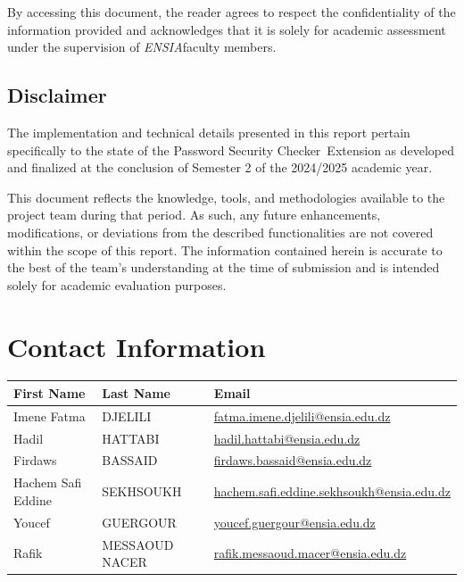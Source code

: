 \documentclass[11pt,oneside,a4paper]{book}
\newcommand{\extensionname}{Password Security Checker}
\newcommand{\esia}{\textit{ENSIA}}
\begin{document}
By accessing this document, the reader agrees to respect the confidentiality of the information provided and acknowledges that it is solely for academic assessment under the supervision of \esia faculty members.

\section*{Disclaimer}
The implementation and technical details presented in this report pertain specifically to the state of the \extensionname\ Extension as developed and finalized at the conclusion of Semester 2 of the 2024/2025 academic year.

This document reflects the knowledge, tools, and methodologies available to the project team during that period. As such, any future enhancements, modifications, or deviations from the described functionalities are not covered within the scope of this report. The information contained herein is accurate to the best of the team's understanding at the time of submission and is intended solely for academic evaluation purposes.

\chapter*{Contact Information}
\begin{longtable}{|p{4cm}|p{4cm}|p{7cm}|}
\hline
\textbf{First Name} & \textbf{Last Name} & \textbf{Email} \\
\hline
Imene Fatma & DJELILI & \href{mailto:fatma.imene.djelili@ensia.edu.dz}{fatma.imene.djelili@ensia.edu.dz} \\
Hadil & HATTABI & \href{mailto:hadil.hattabi@ensia.edu.dz}{hadil.hattabi@ensia.edu.dz} \\
Firdaws & BASSAID & \href{mailto:firdaws.bassaid@ensia.edu.dz}{firdaws.bassaid@ensia.edu.dz} \\
Hachem Safi Eddine & SEKHSOUKH & \href{mailto:hachem.safi.eddine.sekhsoukh@ensia.edu.dz}{hachem.safi.eddine.sekhsoukh@ensia.edu.dz} \\
Youcef & GUERGOUR & \href{mailto:youcef.guergour@ensia.edu.dz}{youcef.guergour@ensia.edu.dz} \\
Rafik & MESSAOUD NACER & \href{mailto:rafik.messaoud.nacer@ensia.edu.dz}{rafik.messaoud.macer@ensia.edu.dz} \\
\hline
\end{longtable}
\end{document}
